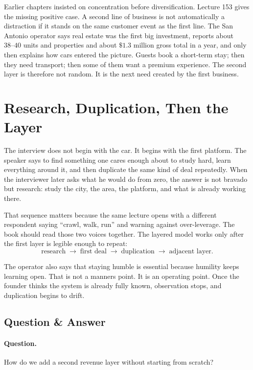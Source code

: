 \documentclass[11pt,oneside]{book}
\begin{document}
Earlier chapters insisted on concentration before diversification. Lecture 153 gives the missing positive case. A second line of business is not automatically a distraction if it stands on the same customer event as the first line. The San Antonio operator says real estate was the first big investment, reports about \(38\text{--}40\) units and properties and about \(\$1.3\) million gross total in a year, and only then explains how cars entered the picture. Guests book a short-term stay; then they need transport; then some of them want a premium experience. The second layer is therefore not random. It is the next need created by the first business.

\section{Research, Duplication, Then the Layer}

The interview does not begin with the car. It begins with the first platform. The speaker says to find something one cares enough about to study hard, learn everything around it, and then duplicate the same kind of deal repeatedly. When the interviewer later asks what he would do from zero, the answer is not bravado but research: study the city, the area, the platform, and what is already working there.

That sequence matters because the same lecture opens with a different respondent saying ``crawl, walk, run'' and warning against over-leverage. The book should read those two voices together. The layered model works only after the first layer is legible enough to repeat:
\[
\text{research}
\;\longrightarrow\;
\text{first deal}
\;\longrightarrow\;
\text{duplication}
\;\longrightarrow\;
\text{adjacent layer}.
\]

The operator also says that staying humble is essential because humility keeps learning open. That is not a manners point. It is an operating point. Once the founder thinks the system is already fully known, observation stops, and duplication begins to drift.

\subsection{Question \& Answer}

\paragraph{Question.}
How do we add a second revenue layer without starting from scratch?
\end{document}
